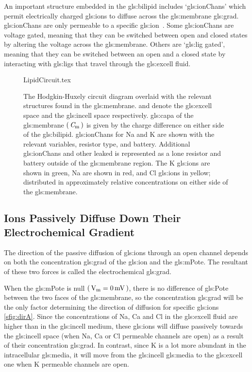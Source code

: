 \documentclass[class={myRUCProject}, crop=false]{standalone}
\begin{document}
An important structure embedded in the \gls{gls:bilipid} includes `\glspl{gls:ionChan}' which permit electrically charged \glspl{gls:ion} to diffuse across the \gls{gls:membrane} \gls{gls:grad}. \Glspl{gls:ionChan} are only permeable to a specific \gls{gls:ion}~\cite{}. Some \glspl{gls:ionChan} are voltage gated, meaning that they can be switched between open and closed states by altering the voltage across the \gls{gls:membrane}. 
Others are `\gls{gls:lig} gated', meaning that they can be switched between an open and a closed state by interacting with \glspl{gls:lig} that travel through the \gls{gls:excell} fluid. 

\vspace{1em}

\begin{figure}[H]
    \centering
    {LipidCircuit.tex}
    \caption{The Hodgkin-Huxely circuit diagram overlaid with the relevant structures found in the \gls{gls:membrane}.  and  denote the \gls{gls:excell} space and the \gls{gls:incell} space respectively. \Gls{gls:capa} of the \gls{gls:membrane} \(\br{\cap\membrane}\) is given by the charge difference on either side of the \gls{gls:bilipid}. \Glspl{gls:ionChan} for \gls{Na} and \gls{K} are shown with the relevant variables, resistor type, and battery. Additional \glspl{gls:ionChan} and other leaked is represented as a lone resistor and battery outside of the \gls{gls:membrane} region. The \gls{K} \glspl{gls:ion} are shown in green, \gls{Na} are shown in red, and \gls{Cl} \glspl{gls:ion} in yellow; distributed in approximately relative concentrations on either side of the \gls{gls:membrane}. }\label{fig:MembraneCircut}
\end{figure}


\subsection{Ions Passively Diffuse Down Their Electrochemical Gradient}
The direction of the passive diffusion of \glspl{gls:ion} through an open channel depends on both the concentration \gls{gls:grad} of the \gls{gls:ion} and the \gls{gls:mPote}. The resultant of these two forces is called the electrochemical \gls{gls:grad}.

When  the \gls{gls:mPote} is null \(\br{\unit{\V\membrane}=\qty{0}{\mV}}\), there is no difference of \gls{gls:Pote} between the two faces of the \gls{gls:membrane}, so the concentration \gls{gls:grad} will be the only factor determining the direction of diffusion for specific \glspl{gls:ion} \cref{sfig:dirA}. Since the concentrations of \gls{Na}, \gls{Ca} and \gls{Cl}  in the \gls{gls:excell} fluid are higher than in the  \gls{gls:incell} medium, these \glspl{gls:ion} will diffuse passively towards the \gls{gls:incell} space (when \gls{Na}, \gls{Ca} or \gls{Cl} permeable channels are open) as a result of their concentration \gls{gls:grad}. In contrast, since \gls{K} is a lot more abundant in the intracellular \gls{gls:media}, it will move from the \gls{gls:incell} \gls{gls:media} to the \gls{gls:excell} one when \gls{K} permeable channels are open. 
\end{document}
